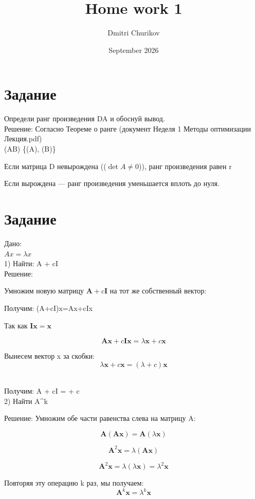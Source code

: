 \documentclass{article}
\title{Home work 1}
\author{Dmitri Churikov}
\date{September 2026}
\DeclareMathOperator{\rank}{rank}
\begin{document}
\maketitle

\section{Задание}

Определи ранг произведения DA и обоснуй вывод.
\\

Решение:
Согласно Теореме о ранге (документ Неделя 1 Методы оптимизации Лекция.pdf) 
\\
\rank(AB) \le \min\{\rank(A), \rank(B)\}

Если матрица  D невырождена ((\(\det A \neq 0\))), ранг произведения равен r

Если вырождена — ранг произведения уменьшается вплоть до нуля.


\section{Задание}
Дано:  \\
$Ax = \lambda x$\\
1) Найти: A + cI \\

Решение:

Умножим новую матрицу \(\mathbf{A} + c\mathbf{I}\) на тот же собственный вектор:

Получим:
 (A+cI)x=Ax+cIx
 
 Так как \(\mathbf{I}\mathbf{x} = \mathbf{x}\) 

 \[\mathbf{Ax}+c\mathbf{Ix}=\lambda \mathbf{x}+c\mathbf{x}\]

Вынесем вектор x за скобки:\[\lambda \mathbf{x}+c\mathbf{x}=(\lambda +c)\mathbf{x}\] 

Получим:
A + cI = \lambda + c \\


2) Найти A^k

Решение:
Умножим обе части равенства слева на матрицу A:

\[\mathbf{A}(\mathbf{Ax})=\mathbf{A}(\lambda \mathbf{x})\]

\[\mathbf{A}^{2}\mathbf{x}=\lambda (\mathbf{Ax})\]

\[\mathbf{A}^{2}\mathbf{x}=\lambda (\lambda \mathbf{x})=\lambda ^{2}\mathbf{x}\]

Повторяя эту операцию k раз, мы получаем:\[\mathbf{A}^{k}\mathbf{x}=\lambda ^{k}\mathbf{x}\]
\end{document}
